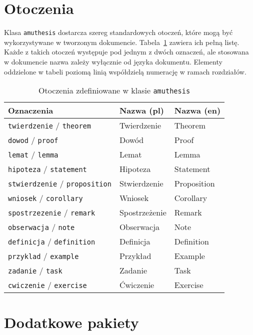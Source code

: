 \documentclass[oneside]{amuthesis}
\begin{document}
\section{Otoczenia}

Klasa \texttt{amuthesis} dostarcza szereg standardowych otoczeń, które mogą być wykorzystywane w tworzonym dokumencie. Tabela~\ref{table:amuthesis-otoczenia} zawiera ich pełną listę. Każde z takich otoczeń występuje pod jednym z dwóch oznaczeń, ale stosowana w dokumencie nazwa zależy wyłącznie od języka dokumentu. Elementy oddzielone w tabeli poziomą linią współdzielą numerację w ramach rozdziałów.

\begin{table}
  \caption{Otoczenia zdefiniowane w klasie \texttt{amuthesis}}
  \label{table:amuthesis-otoczenia}
  \centering
  \begin{tabular}{lll}
    \toprule
    Oznaczenia & Nazwa (pl) & Nazwa (en)\\
    \midrule
    \texttt{twierdzenie} / \texttt{theorem} & Twierdzenie & Theorem\\
    \texttt{dowod} / \texttt{proof} & Dowód & Proof\\
    \texttt{lemat} / \texttt{lemma} & Lemat & Lemma\\
    \texttt{hipoteza} / \texttt{statement} & Hipoteza & Statement\\
    \texttt{stwierdzenie} / \texttt{proposition} & Stwierdzenie & Proposition\\
    \texttt{wniosek} / \texttt{corollary} & Wniosek & Corollary\\
    \texttt{spostrzezenie} / \texttt{remark} & Spostrzeżenie & Remark\\
    \texttt{obserwacja} / \texttt{note} & Obserwacja & Note\\
    \midrule
    \texttt{definicja} / \texttt{definition} & Definicja & Definition\\
    \midrule
    \texttt{przyklad} / \texttt{example} & Przykład & Example\\
    \midrule
    \texttt{zadanie} / \texttt{task} & Zadanie & Task\\
    \texttt{cwiczenie} / \texttt{exercise} & Ćwiczenie & Exercise\\
    \bottomrule
  \end{tabular}
\end{table}

\section{Dodatkowe pakiety}
\end{document}
